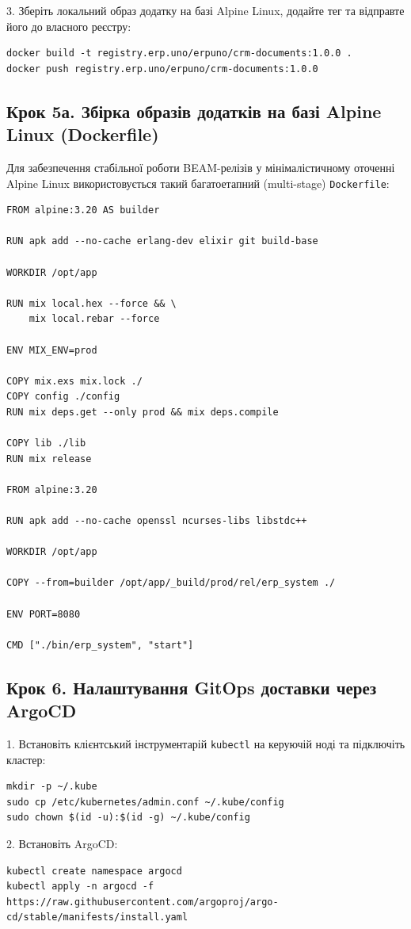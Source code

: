 \documentclass{article}
\begin{document}
3. Зберіть локальний образ додатку на базі Alpine Linux, додайте тег та відправте його до власного реєстру:
\begin{lstlisting}
docker build -t registry.erp.uno/erpuno/crm-documents:1.0.0 .
docker push registry.erp.uno/erpuno/crm-documents:1.0.0
\end{lstlisting}

\subsection{Крок 5а. Збірка образів додатків на базі Alpine Linux (Dockerfile)}
Для забезпечення стабільної роботи BEAM-релізів у мінімалістичному оточенні Alpine Linux використовується такий багатоетапний (multi-stage) \texttt{Dockerfile}:

\begin{lstlisting}
FROM alpine:3.20 AS builder

RUN apk add --no-cache erlang-dev elixir git build-base

WORKDIR /opt/app

RUN mix local.hex --force && \
    mix local.rebar --force

ENV MIX_ENV=prod

COPY mix.exs mix.lock ./
COPY config ./config
RUN mix deps.get --only prod && mix deps.compile

COPY lib ./lib
RUN mix release

FROM alpine:3.20

RUN apk add --no-cache openssl ncurses-libs libstdc++

WORKDIR /opt/app

COPY --from=builder /opt/app/_build/prod/rel/erp_system ./

ENV PORT=8080

CMD ["./bin/erp_system", "start"]
\end{lstlisting}

\subsection{Крок 6. Налаштування GitOps доставки через ArgoCD}
1. Встановіть клієнтський інструментарій \texttt{kubectl} на керуючій ноді та підключіть кластер:
\begin{lstlisting}
mkdir -p ~/.kube
sudo cp /etc/kubernetes/admin.conf ~/.kube/config
sudo chown $(id -u):$(id -g) ~/.kube/config
\end{lstlisting}

2. Встановіть ArgoCD:
\begin{lstlisting}
kubectl create namespace argocd
kubectl apply -n argocd -f https://raw.githubusercontent.com/argoproj/argo-cd/stable/manifests/install.yaml
\end{lstlisting}
\end{document}
